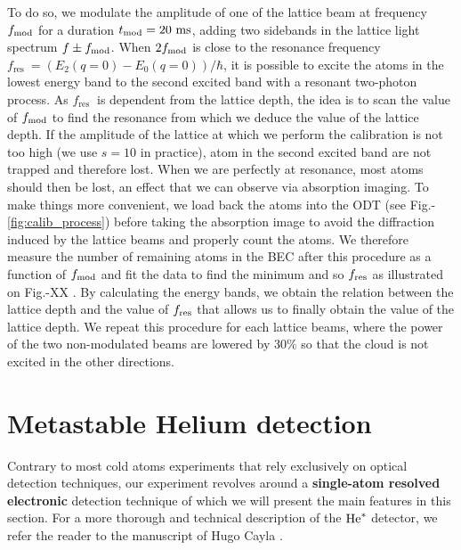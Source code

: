 To do so, we modulate the amplitude of one of the lattice beam at frequency $f_{\rm{mod}}$ for a duration $t_{\rm{mod} }= 20 \ \rm{ms}$, adding two sidebands in the lattice light spectrum $f \pm f_{\rm{mod}}$. When $2 f_{\rm{mod}}$ is close to the resonance frequency $f_{\text {res }}=\left(E_{2}(q=0)-E_{0}(q=0)\right)/\hbar$, it is possible to excite the atoms in the lowest energy band to the second excited band with a resonant two-photon process. As $f_{\text {res }}$ is dependent from the lattice depth, the idea is to scan the value of $f_{\rm{mod}}$ to find the resonance from which we deduce the value of the lattice depth. If the amplitude of the lattice at which we perform the calibration is not too high (we use $s= 10$ in practice), atom in the second excited band are not trapped and therefore lost. When we are perfectly at resonance, most atoms should then be lost, an effect that we can observe via absorption imaging. To make things more convenient, we load back the atoms into the ODT (see Fig.-\ref{fig:calib_process}) before taking the absorption image to avoid the diffraction induced by the lattice beams and properly count the atoms. We therefore measure the number of remaining atoms in the BEC after this procedure as a function of $f_{\rm{mod}}$ and fit the data to find the minimum and so $f_{\rm{res}}$ as illustrated on Fig.-XX . By calculating the energy bands, we obtain the relation between the lattice depth and the value of $f_{\rm{res}}$ that allows us to finally obtain the value of the lattice depth. We repeat this procedure for each lattice beams, where the power of the two non-modulated beams are lowered by $30 \%$ so that the cloud is not excited in the other directions.


\section{Metastable Helium detection}


Contrary to most cold atoms experiments that rely exclusively on optical detection techniques, our experiment revolves around a \textbf{single-atom resolved} \textbf{electronic} detection technique of which we will present the main features in this section. For a more thorough and technical description of the $\mathrm{He}^*$ detector, we refer the reader to the manuscript of Hugo Cayla \cite{cayla_these}.

